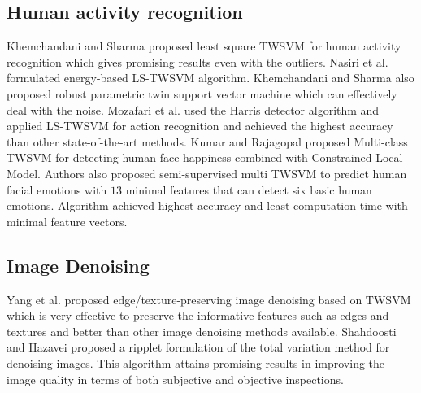 \documentclass[pdflatex,sn-mathphys]{sn-jnl}%
\theoremstyle{thmstyleone}%
\theoremstyle{thmstyletwo}%
\theoremstyle{thmstylethree}%
\begin{document}
\subsection{Human activity recognition}
Khemchandani and Sharma \cite{khemchandani2016robust} proposed least square TWSVM for human activity recognition which gives promising results even with the outliers. Nasiri et al. \cite{nasiri2014energy} formulated energy-based LS-TWSVM algorithm. Khemchandani and Sharma \cite{khemchandani2017robust} also proposed robust parametric twin support vector machine which can effectively deal with the noise. Mozafari et al. \cite{mozafari2011action} used the Harris detector algorithm and applied LS-TWSVM for action recognition and achieved the highest accuracy than other state-of-the-art methods. Kumar and Rajagopal \cite{kumar2018detecting} proposed Multi-class TWSVM for detecting human face happiness combined with Constrained Local Model.
Authors \cite{kumar2019detecting} also proposed semi-supervised multi TWSVM to predict human facial emotions with $13$ minimal features that can detect six basic human emotions. Algorithm achieved highest accuracy and least
computation time with minimal feature vectors.

\subsection{Image Denoising}
Yang et al. \cite{yang2014image} proposed edge/texture-preserving image denoising based on TWSVM which is very effective to preserve the informative features such as edges and textures and better than other image denoising methods available. Shahdoosti and Hazavei \cite{shahdoosti2018combined} proposed a ripplet formulation of the total variation method for denoising images. This algorithm attains promising results in improving the image quality in terms of both subjective and objective inspections.
\end{document}
